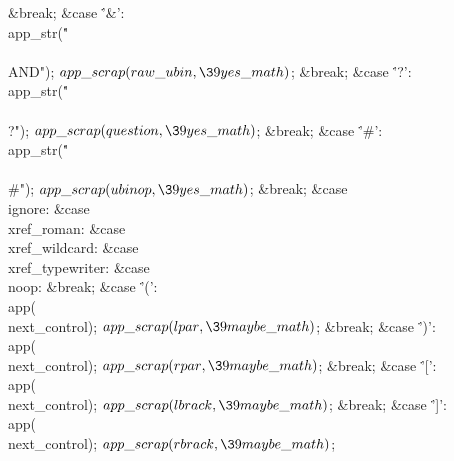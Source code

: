 \&{break};\6
\4\&{case} \.{'\&'}:\5
\\{app\_str}(\.{"\\\\AND"});\5
${}\\{app\_scrap}(\\{raw\_ubin},\39\\{yes\_math}){}$;\5
\&{break};\6
\4\&{case} \.{'?'}:\5
\\{app\_str}(\.{"\\\\?"});\5
${}\\{app\_scrap}(\\{question},\39\\{yes\_math}){}$;\5
\&{break};\6
\4\&{case} \.{'\#'}:\5
\\{app\_str}(\.{"\\\\\#"});\5
${}\\{app\_scrap}(\\{ubinop},\39\\{yes\_math}){}$;\5
\&{break};\6
\4\&{case} \\{ignore}:\5
\&{case} \\{xref\_roman}:\5
\&{case} \\{xref\_wildcard}:\5
\&{case} \\{xref\_typewriter}:\5
\&{case} \\{noop}:\5
\&{break};\6
\4\&{case} \.{'('}:\5
\\{app}(\\{next\_control});\5
${}\\{app\_scrap}(\\{lpar},\39\\{maybe\_math}){}$;\5
\&{break};\6
\4\&{case} \.{')'}:\5
\\{app}(\\{next\_control});\5
${}\\{app\_scrap}(\\{rpar},\39\\{maybe\_math}){}$;\5
\&{break};\6
\4\&{case} \.{'['}:\5
\\{app}(\\{next\_control});\5
${}\\{app\_scrap}(\\{lbrack},\39\\{maybe\_math}){}$;\5
\&{break};\6
\4\&{case} \.{']'}:\5
\\{app}(\\{next\_control});\5
${}\\{app\_scrap}(\\{rbrack},\39\\{maybe\_math}){}$;\5
